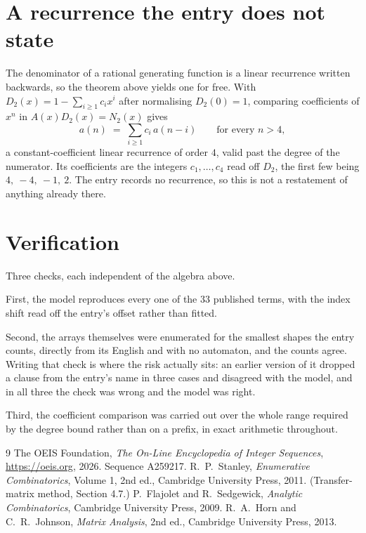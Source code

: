 \documentclass[11pt,a4paper]{article}
\theoremstyle{plain}
\theoremstyle{definition}
\begin{document}
\section{A recurrence the entry does not state}

The denominator of a rational generating function is a linear recurrence written backwards, so
the theorem above yields one for free. With $D_2(x)=1-\sum_{i\ge1}c_ix^i$ after normalising
$D_2(0)=1$, comparing coefficients of $x^n$ in $A(x)D_2(x)=N_2(x)$ gives
\[
a(n)\;=\;\sum_{i\ge1}c_i\,a(n-i)\qquad\text{for every }n>4,
\]
a constant-coefficient linear recurrence of order $4$, valid past the degree of the
numerator. Its coefficients are the integers $c_1,\dots,c_{4}$ read off $D_2$, the first few being $4,\ -4,\ -1,\ 2$. The entry records no recurrence, so this is not a restatement of anything
already there.

\section{Verification}

Three checks, each independent of the algebra above.

First, the model reproduces every one of the $33$ published terms, with the index shift
read off the entry's offset rather than fitted.

Second, the arrays themselves were enumerated for the smallest shapes the entry counts,
directly from its English and with no automaton, and the counts agree. Writing that check is
where the risk actually sits: an earlier version of it dropped a clause from the entry's name
in three cases and disagreed with the model, and in all three the check was wrong and the model
was right.

Third, the coefficient comparison was carried out over the whole range required by the degree
bound rather than on a prefix, in exact arithmetic throughout.

\begin{thebibliography}{9}
 The OEIS Foundation, \emph{The On-Line Encyclopedia of Integer
Sequences}, \url{https://oeis.org}, 2026. Sequence A259217.
 R.~P.~Stanley, \emph{Enumerative Combinatorics}, Volume 1, 2nd ed.,
Cambridge University Press, 2011. (Transfer-matrix method, Section 4.7.)
 P.~Flajolet and R.~Sedgewick, \emph{Analytic Combinatorics}, Cambridge
University Press, 2009.
 R.~A.~Horn and C.~R.~Johnson, \emph{Matrix Analysis}, 2nd ed., Cambridge
University Press, 2013.
\end{thebibliography}
\end{document}
